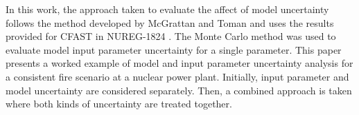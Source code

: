 In this work, the approach taken to evaluate the affect of model uncertainty follows the method developed by McGrattan and Toman and uses the results provided for CFAST in NUREG-1824 \cite{NUREG_1824_Sup_1}. The Monte Carlo method was used to evaluate model input parameter uncertainty for a single parameter. This paper presents a worked example of model and input parameter uncertainty analysis for a consistent fire scenario at a  nuclear power plant.  Initially, input parameter and model uncertainty are considered separately. Then, a combined approach is taken where both kinds of uncertainty are treated together.
 
 
 

 
 
 
 
 



